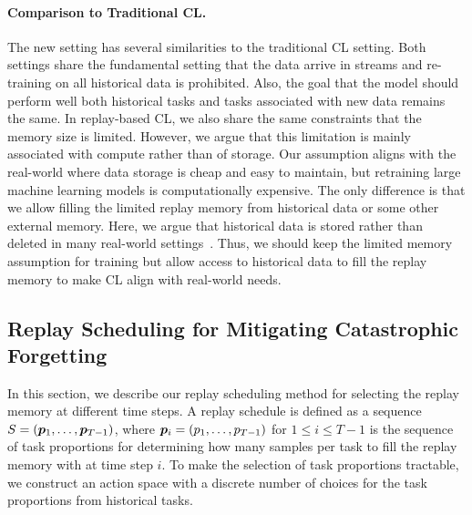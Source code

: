 \paragraph{Comparison to Traditional CL.} The new setting has several similarities to the traditional CL setting. Both settings share the fundamental setting that the data arrive in streams and re-training on all historical data is prohibited. Also, the goal that the model should perform well both historical tasks and tasks associated with new data remains the same. In replay-based CL, we also share the same constraints that the memory size is limited. However, we argue that this limitation is mainly associated with compute rather than of storage. Our assumption aligns with the real-world where data storage is cheap and easy to maintain, but retraining large machine learning models is computationally expensive. The only difference is that we allow filling the limited replay memory from historical data or some other external memory. Here, we argue that historical data is stored rather than deleted in many real-world settings~\cite{bailis2017macrobase}. Thus, we should keep the limited memory assumption for training but allow access to historical data to fill the replay memory to make CL align with real-world needs.



\subsection{Replay Scheduling for Mitigating Catastrophic Forgetting}

In this section, we describe our replay scheduling method for selecting the replay memory at different time steps. A replay schedule is defined as a sequence $S = ({\bm{p}}_1, \dots, {\bm{p}}_{T-1})$, where ${\bm{p}}_i = (p_1, \dots, p_{T-1})$ for $1 \leq i \leq T-1$ is the sequence of task proportions for determining how many samples per task to fill the replay memory with at time step $i$. To make the selection of task proportions tractable, we construct an action space with a discrete number of choices for the task proportions from historical tasks. 

